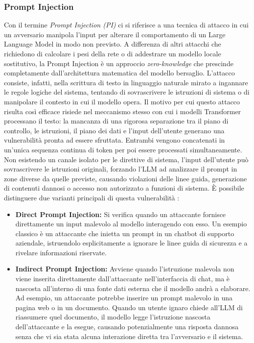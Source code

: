 \subsubsection{Prompt Injection}
Con il termine \textit{Prompt Injection (PI)} ci si riferisce a una tecnica di attacco in cui un avversario manipola l'input per alterare il comportamento di un Large Language Model in modo non previsto. A differenza di altri attacchi che richiedono di calcolare i pesi della rete o di addestrare un modello locale sostitutivo, la Prompt Injection è un approccio \textit{zero-knowledge} che prescinde completamente dall'architettura matematica del modello bersaglio. L'attacco consiste, infatti, nella scrittura di testo in linguaggio naturale mirato a ingannare le regole logiche del sistema, tentando di sovrascrivere le istruzioni di sistema o di manipolare il contesto in cui il modello opera.
Il motivo per cui questo attacco risulta così efficace risiede nel meccanismo stesso con cui i modelli Transformer processano il testo: la mancanza di una rigorosa separazione tra il piano di controllo, le istruzioni, il piano dei dati e l'input dell'utente generano una vulnerabilità pronta ad essere sfruttata. Entrambi vengono concatenati in un'unica sequenza continua di token per poi essere processati simultaneamente. Non esistendo un canale isolato per le direttive di sistema, l'input dell'utente può sovrascrivere le istruzioni originali, forzando l'LLM ad analizzare il prompt in zone diverse da quelle previste, causando violazioni delle linee guida, generazione di contenuti dannosi o accesso non autorizzato a funzioni di sistema.
È possibile distinguere due varianti principali di questa vulnerabilità \cite{prompt_injection}:
\begin{itemize}
\item \textbf{Direct Prompt Injection:} Si verifica quando un attaccante fornisce direttamente un input malevolo al modello interagendo con esso. Un esempio classico è un attaccante che inietta un prompt in un chatbot di supporto aziendale, istruendolo esplicitamente a ignorare le linee guida di sicurezza e a rivelare informazioni riservate.
\item \textbf{Indirect Prompt Injection:} Avviene quando l'istruzione malevola non viene inserita direttamente dall'attaccante nell'interfaccia di chat, ma è nascosta all'interno di una fonte dati esterna che il modello andrà a elaborare. Ad esempio, un attaccante potrebbe inserire un prompt malevolo in una pagina web o in un documento. Quando un utente ignaro chiede all'LLM di riassumere quel documento, il modello legge l'istruzione nascosta dell'attaccante e la esegue, causando potenzialmente una risposta dannosa senza che vi sia stata alcuna interazione diretta tra l'avversario e il sistema.
\end{itemize}

